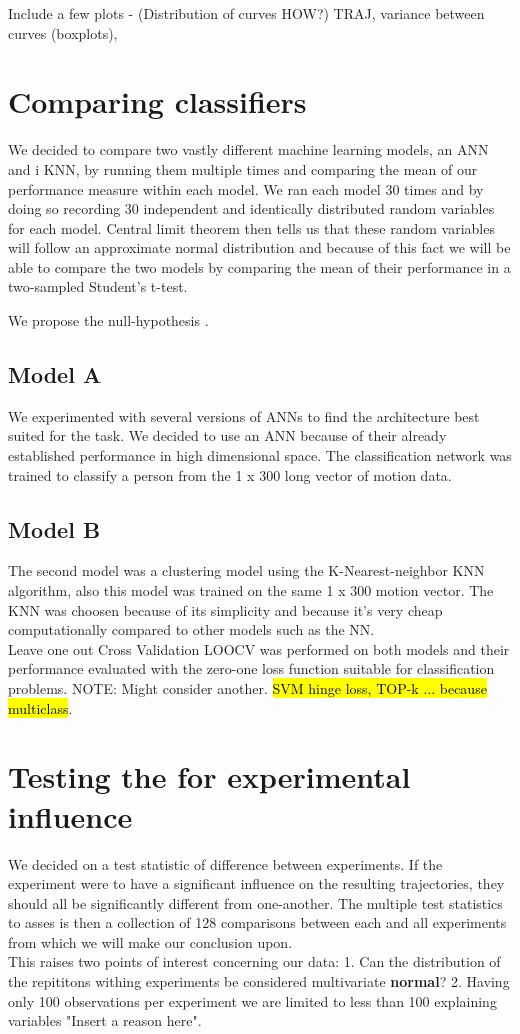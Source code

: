 \documentclass{article}
\begin{document}
Include a few plots - (Distribution of curves HOW?)
TRAJ, variance between curves (boxplots), 

\section{Comparing classifiers}
We decided to compare two vastly different machine learning models, an ANN and i KNN, by running them multiple times and comparing the mean of our performance measure within each model. We ran each model 30 times and by doing so recording 30 independent and identically distributed random variables for each model. Central limit theorem then tells us that these random variables will follow an approximate normal distribution and because of this fact we will be able to compare the two models by comparing the mean of their performance in a two-sampled Student's t-test.

We propose the null-hypothesis . 
\subsection{Model A}
We experimented with several versions of ANNs to find the  architecture best suited for the task. We decided to use an ANN because of their already established performance in high dimensional space. The classification network was trained to classify a person from the 1 x 300 long vector of motion data.   


\subsection{Model B}
The second model was a clustering model using the K-Nearest-neighbor KNN algorithm, also this model was trained on the same 1 x 300 motion vector.
The KNN was choosen because of its simplicity and because it's very cheap computationally compared to other models such as the NN.
\\
Leave one out Cross Validation LOOCV was performed on both models and their performance evaluated with the zero-one loss function suitable for classification problems. NOTE: Might consider another. \hl{SVM hinge loss, TOP-k ... because multiclass}.



\section{Testing the for experimental influence}
We decided on a test statistic of difference between experiments. If the experiment were to have a significant influence on the resulting trajectories, they should all be significantly different from one-another. The multiple test statistics to asses is then a collection of 128 comparisons between each and all experiments from which we will make our conclusion upon.\\ This raises two points of interest concerning our data:
1. Can the distribution of the repititons withing experiments be considered multivariate \textbf{normal}?
2. Having only 100 observations per experiment we are limited to less than 100 explaining variables "Insert a reason here".
\end{document}
